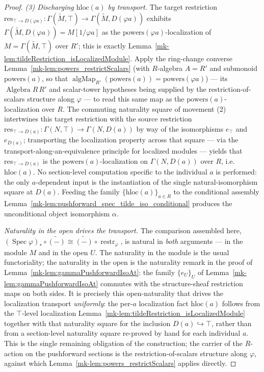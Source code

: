 \begin{proof}
  \emph{(3) Discharging \(\mathrm{hloc}(a)\) by transport.} The target restriction
  \(\mathrm{res}_{\top \to D(\varphi a)} : \Gamma(\widetilde M, \top) \to
  \Gamma(\widetilde M, D(\varphi a))\) exhibits \(\Gamma(\widetilde M, D(\varphi a)) =
  M[1/\varphi a]\) as the \(\mathrm{powers}(\varphi a)\)-localization of
  \(M = \Gamma(\widetilde M, \top)\) over \(R'\); this is exactly
  Lemma~\ref{mk-lem:tildeRestriction_isLocalizedModule}. Apply the ring-change converse
  Lemma~\ref{mk-lem:powers_restrictScalars} (with \(R\)-algebra \(A = R'\) and submonoid
  \(\mathrm{powers}(a)\), so that
  \(\operatorname{algMap}_{R'}(\mathrm{powers}(a)) = \mathrm{powers}(\varphi a)\)) —
  its \(\operatorname{Algebra} R\, R'\) and scalar-tower hypotheses being supplied by
  the restriction-of-scalars structure along \(\varphi\) — to read this same map as
  the \(\mathrm{powers}(a)\)-localization over \(R\). The commuting naturality square
  of movement (2) intertwines this target restriction with the source restriction
  \(\mathrm{res}_{\top \to D(a)} : \Gamma(N, \top) \to \Gamma(N, D(a))\) by way of the
  isomorphisms \(e_\top\) and \(e_{D(a)}\); transporting the localization property
  across that square — via the transport-along-an-equivalence principle for localized
  modules — yields that \(\mathrm{res}_{\top \to D(a)}\) is the
  \(\mathrm{powers}(a)\)-localization on \(\Gamma(N, D(a))\) over \(R\), i.e.\
  \(\mathrm{hloc}(a)\). No section-level computation specific to the individual \(a\)
  is performed: the only \(a\)-dependent input is the instantiation of the single
  natural-isomorphism square at \(D(a)\). Feeding the family
  \(\{\mathrm{hloc}(a)\}_{a \in R}\) to the conditional assembly
  Lemma~\ref{mk-lem:pushforward_spec_tilde_iso_conditional} produces the unconditional
  object isomorphism \(\alpha\).

  \medskip
  \emph{Naturality in the open drives the transport.} The comparison assembled
  here, \((\operatorname{Spec}\varphi)_* \circ \widetilde{(-)} \cong
  \widetilde{(-)} \circ \operatorname{restr}_\varphi\), is natural in \emph{both}
  arguments — in the module \(M\) and in the open \(U\). The naturality in the
  module is the usual functoriality; the naturality in the open is the naturality
  remark in the proof of Lemma~\ref{mk-lem:gammaPushforwardIsoAt}: the family
  \(\{e_U\}_U\) of Lemma~\ref{mk-lem:gammaPushforwardIsoAt} commutes with the
  structure-sheaf restriction maps on both sides. It is precisely this
  open-naturality that drives the localization transport \emph{uniformly}: the
  per-\(a\) localization fact \(\mathrm{hloc}(a)\) follows from the \(\top\)-level
  localization Lemma~\ref{mk-lem:tildeRestriction_isLocalizedModule} together with that
  naturality square for the inclusion
  \(D(a) \hookrightarrow \top\), rather than from a section-level naturality square
  re-proved by hand for each individual \(a\). This is the single remaining
  obligation of the construction; the carrier of the \(R\)-action on the pushforward
  sections is the restriction-of-scalars structure along \(\varphi\), against which
  Lemma~\ref{mk-lem:powers_restrictScalars} applies directly.


\end{proof}
